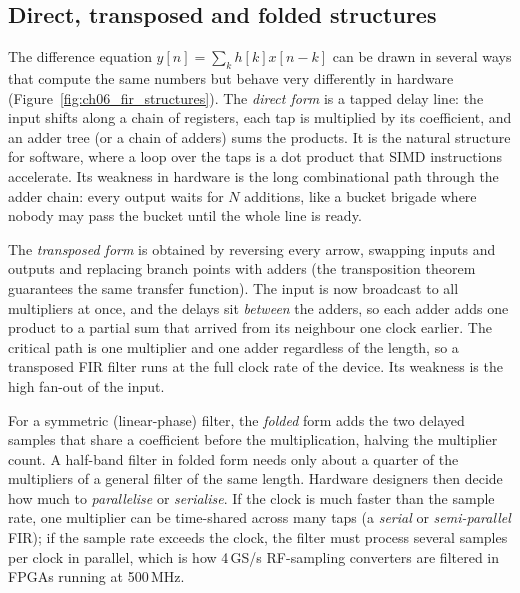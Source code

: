 \subsection{Direct, transposed and folded structures}

The difference equation $y[n]=\sum_kh[k]x[n-k]$ can be drawn in several ways that compute the same
numbers but behave very differently in hardware (Figure~\ref{fig:ch06_fir_structures}). The
\emph{direct form} is a tapped delay line: the input shifts along a chain of registers, each tap is
multiplied by its coefficient, and an adder tree (or a chain of adders) sums the products. It is
the natural structure for software, where a loop over the taps is a dot product that SIMD
instructions accelerate. Its weakness in hardware is the long combinational path through the adder
chain: every output waits for $N$ additions, like a bucket brigade where nobody may pass the bucket
until the whole line is ready.

The \emph{transposed form} is obtained by reversing every arrow, swapping inputs and outputs and
replacing branch points with adders (the transposition theorem guarantees the same transfer
function). The input is now broadcast to all multipliers at once, and the delays sit
\emph{between} the adders, so each adder adds one product to a partial sum that arrived from its
neighbour one clock earlier. The critical path is one multiplier and one adder regardless of the
length, so a transposed FIR filter runs at the full clock rate of the device. Its weakness is the
high fan-out of the input.


For a symmetric (linear-phase) filter, the \emph{folded} form adds the two delayed samples that
share a coefficient before the multiplication, halving the multiplier count. A half-band filter in
folded form needs only about a quarter of the multipliers of a general filter of the same length.
Hardware designers then decide how much to \emph{parallelise} or \emph{serialise}. If the clock is
much faster than the sample rate, one multiplier can be time-shared across many taps (a
\emph{serial} or \emph{semi-parallel} FIR); if the sample rate exceeds the clock, the filter must
process several samples per clock in parallel, which is how 4\,GS/s RF-sampling converters are
filtered in FPGAs running at 500\,MHz.

